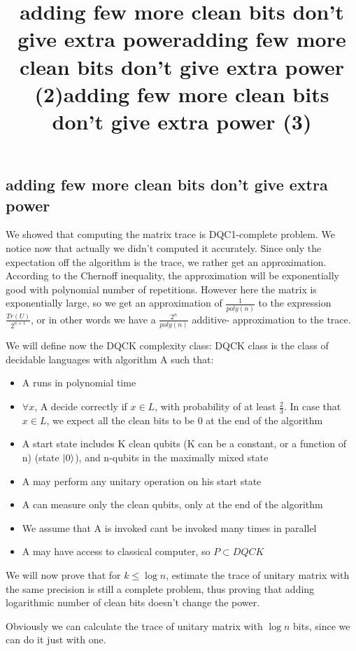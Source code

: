 \documentclass{article}
\begin{document}
\subsection{adding few more clean bits don't give extra power}
\title{adding few more clean bits don't give extra power}
We showed that computing the matrix trace is DQC1-complete problem.
We notice now that actually we didn't computed it accurately. Since only the expectation off the algorithm is the trace, we rather get an approximation. According to the Chernoff inequality, the approximation will be exponentially  good with polynomial number of repetitions. However here the matrix is exponentially large, so we get an approximation of $\frac{1}{poly(n)}$ to the expression $\frac{Tr(U)}{2^{n+1}}$, or  in other words we have a $\frac{2^{n}}{poly(n)}$ additive- approximation to the trace. 


\title{adding few more clean bits don't give extra power (2)}
We will define now the DQCK complexity class:
DQCK class is the class of decidable languages with algorithm A such that:
\begin{itemize}
\item A runs in polynomial time
\item $\forall x$, A decide correctly if $x \in L$, with probability of at least $\frac{2}{3}$. 
In case that $x \in L$, we expect all the clean bits to be 0 at the end of the algorithm
\item A start state includes K clean qubits (K can be a constant, or a function of n) (state $\left\vert{0}\right\rangle$), and n-qubits in the maximally mixed state
\item A may perform any unitary operation on his start state
\item A can measure only the clean qubits, only at the end of the algorithm
\item We assume that A is invoked cant be invoked many times in parallel
\item A may have access to classical computer, so $P \subset DQCK$ 
\end{itemize}  


\title{adding few more clean bits don't give extra power (3)}
We will now prove that for $k \leq \log{n}$, estimate the trace of unitary matrix with the same precision is still a complete problem, thus proving that adding logarithmic number of clean bits doesn't change the power. 

Obviously we can calculate the trace of unitary matrix with $\log{n}$ bits, since we can do it just with one. 
\end{document}
